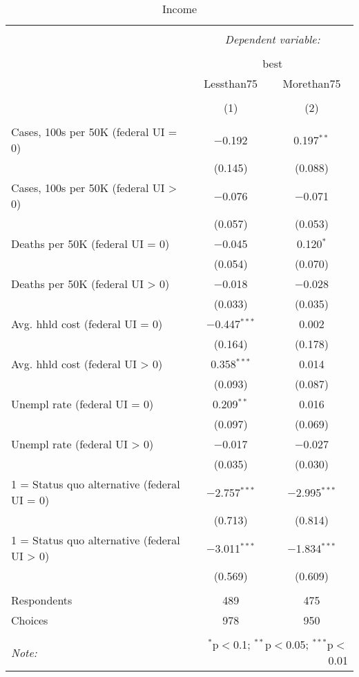 
\begin{table}[!htbp] \centering 
  \caption{Income} 
  \label{} 
\begin{tabular}{@{\extracolsep{5pt}}lcc} 
\\[-1.8ex]\hline 
\hline \\[-1.8ex] 
 & \multicolumn{2}{c}{\textit{Dependent variable:}} \\ 
\cline{2-3} 
\\[-1.8ex] & \multicolumn{2}{c}{best} \\ 
 & Lessthan75 & Morethan75 \\ 
\\[-1.8ex] & (1) & (2)\\ 
\hline \\[-1.8ex] 
 Cases, 100s per 50K (federal UI = 0) & $-$0.192 & 0.197$^{**}$ \\ 
  & (0.145) & (0.088) \\ 
  Cases, 100s per 50K (federal UI > 0) & $-$0.076 & $-$0.071 \\ 
  & (0.057) & (0.053) \\ 
  Deaths per 50K (federal UI = 0) & $-$0.045 & 0.120$^{*}$ \\ 
  & (0.054) & (0.070) \\ 
  Deaths per 50K (federal UI > 0) & $-$0.018 & $-$0.028 \\ 
  & (0.033) & (0.035) \\ 
  Avg. hhld cost (federal UI = 0) & $-$0.447$^{***}$ & 0.002 \\ 
  & (0.164) & (0.178) \\ 
  Avg. hhld cost (federal UI > 0) & 0.358$^{***}$ & 0.014 \\ 
  & (0.093) & (0.087) \\ 
  Unempl rate (federal UI = 0) & 0.209$^{**}$ & 0.016 \\ 
  & (0.097) & (0.069) \\ 
  Unempl rate (federal UI > 0) & $-$0.017 & $-$0.027 \\ 
  & (0.035) & (0.030) \\ 
  1 = Status quo alternative (federal UI = 0) & $-$2.757$^{***}$ & $-$2.995$^{***}$ \\ 
  & (0.713) & (0.814) \\ 
  1 = Status quo alternative (federal UI > 0) & $-$3.011$^{***}$ & $-$1.834$^{***}$ \\ 
  & (0.569) & (0.609) \\ 
 \hline \\[-1.8ex] 
Respondents & 489 & 475\\ 
 Choices & 978 & 950\\ 
\hline 
\hline \\[-1.8ex] 
\textit{Note:}  & \multicolumn{2}{r}{$^{*}$p$<$0.1; $^{**}$p$<$0.05; $^{***}$p$<$0.01} \\ 
\end{tabular} 
\end{table} 
